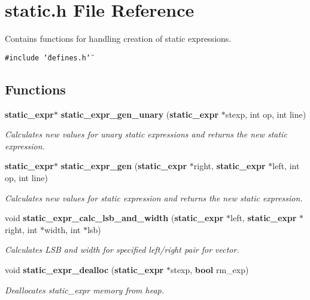 \section{static.h File Reference}
\label{static_8h}
Contains functions for handling creation of static expressions. 


{\tt \#include \char`\"{}defines.h\char`\"{}}\par
\subsection*{Functions}
\begin{CompactItemize}
\item 
{\bf static\_\-expr}$\ast$ {\bf static\_\-expr\_\-gen\_\-unary} ({\bf static\_\-expr} $\ast$stexp, int op, int line)
\begin{CompactList}\small\item\em Calculates new values for unary static expressions and returns the new static expression.\item\end{CompactList}\item 
{\bf static\_\-expr}$\ast$ {\bf static\_\-expr\_\-gen} ({\bf static\_\-expr} $\ast$right, {\bf static\_\-expr} $\ast$left, int op, int line)
\begin{CompactList}\small\item\em Calculates new values for static expression and returns the new static expression.\item\end{CompactList}\item 
void {\bf static\_\-expr\_\-calc\_\-lsb\_\-and\_\-width} ({\bf static\_\-expr} $\ast$left, {\bf static\_\-expr} $\ast$right, int $\ast$width, int $\ast$lsb)
\begin{CompactList}\small\item\em Calculates LSB and width for specified left/right pair for vector.\item\end{CompactList}\item 
void {\bf static\_\-expr\_\-dealloc} ({\bf static\_\-expr} $\ast$stexp, {\bf bool} rm\_\-exp)
\begin{CompactList}\small\item\em Deallocates static\_\-expr memory from heap.\item\end{CompactList}\end{CompactItemize}


